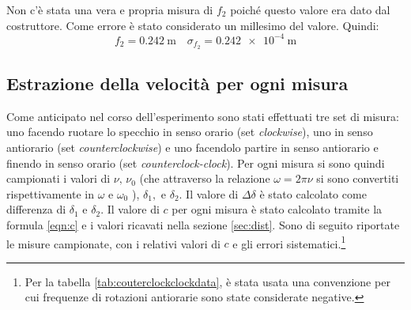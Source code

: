 \documentclass[a4paper,11pt]{article}
\begin{document}
	Non c'è stata una vera e propria misura di $ f_2 $ poiché questo valore era dato dal costruttore. Come errore è stato considerato un millesimo del valore. Quindi:
	\[ 
	f_2 = \SI{0.242}{\meter} \quad \sigma_{f_2}=\SI{0.242 e-4}{\meter}
	\]
	\subsection{Estrazione della velocità per ogni misura}
	Come anticipato nel corso dell'esperimento sono stati effettuati tre set di misura: uno facendo ruotare lo specchio in senso orario (set \emph{clockwise}), uno in senso antiorario (set \emph{counterclockwise}) e uno facendolo partire in senso antiorario e finendo in senso orario (set \emph{counterclock-clock}). Per ogni misura si sono quindi campionati i valori di $ \nu,\, \nu_0$ (che attraverso la relazione $ \omega=2\pi\nu $ si sono convertiti rispettivamente in $ \omega $ e $ \omega_0 $ ), $\delta_1, $ e $ \delta_2 $. Il valore di $ \Delta\delta $ è stato calcolato come differenza di $ \delta_1 $ e $ \delta_2 $. Il valore di $ c $ per ogni misura è stato calcolato tramite la formula \ref{eqn:c} e i valori ricavati nella sezione \ref{sec:dist}. Sono di seguito riportate le misure campionate, con i relativi valori di $ c $ e gli errori sistematici.\footnote{Per la tabella \ref{tab:couterclockclockdata}, è stata usata una convenzione per cui frequenze di rotazioni antiorarie sono state considerate negative.}
	
\end{document}
